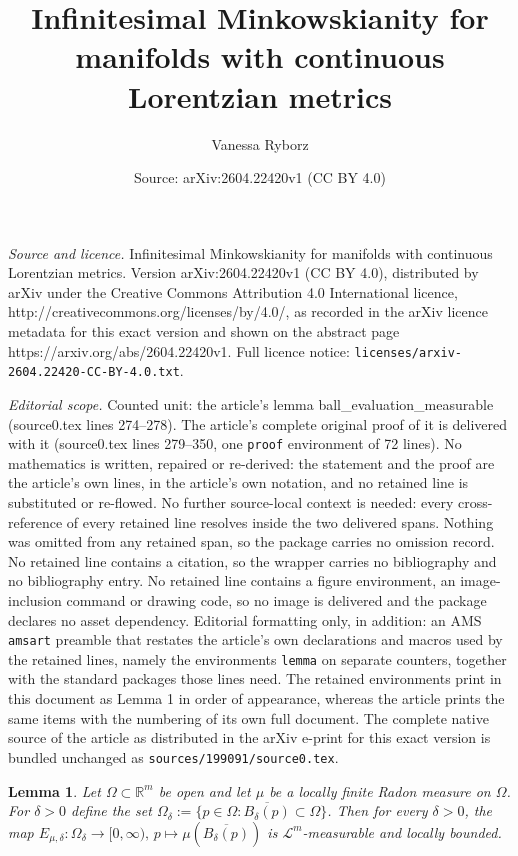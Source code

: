 \documentclass[10pt,a4paper]{amsart}
\title{Infinitesimal Minkowskianity for manifolds with continuous Lorentzian metrics}
\author{Vanessa Ryborz}
\date{Source: arXiv:2604.22420v1 (CC BY 4.0)}
\newtheorem{lemma}{Lemma}
\newcommand{\R}{\mathbb{R}}
\begin{document}
\maketitle

\noindent\emph{Source and licence.} Infinitesimal Minkowskianity for manifolds with continuous Lorentzian metrics. Version arXiv:2604.22420v1 (CC BY 4.0), distributed by arXiv under the Creative Commons Attribution 4.0 International licence, http://creativecommons.org/licenses/by/4.0/, as recorded in the arXiv licence metadata for this exact version and shown on the abstract page https://arxiv.org/abs/2604.22420v1. Full licence notice: \texttt{licenses/arxiv-2604.22420-CC-BY-4.0.txt}.\par\smallskip

\noindent\textit{Editorial scope.} Counted unit: the article's lemma ball\_evaluation\_measurable (source0.tex lines 274--278). The article's complete original proof of it is delivered with it (source0.tex lines 279--350, one \texttt{proof} environment of 72 lines). No mathematics is written, repaired or re-derived: the statement and the proof are the article's own lines, in the article's own notation, and no retained line is substituted or re-flowed.  No further source-local context is needed: every cross-reference of every retained line resolves inside the two delivered spans.  Nothing was omitted from any retained span, so the package carries no omission record.  No retained line contains a citation, so the wrapper carries no bibliography and no bibliography entry.  No retained line contains a figure environment, an image-inclusion command or drawing code, so no image is delivered and the package declares no asset dependency.  Editorial formatting only, in addition: an AMS \texttt{amsart} preamble that restates the article's own declarations and macros used by the retained lines, namely the environments \texttt{lemma} on separate counters, together with the standard packages those lines need.  The retained environments print in this document as Lemma 1 in order of appearance, whereas the article prints the same items with the numbering of its own full document.  The complete native source of the article as distributed in the arXiv e-print for this exact version is bundled unchanged as \texttt{sources/199091/source0.tex}.
\begin{lemma}\label{ball_evaluation_measurable}
    Let $\Omega\subset \R^m$ be open and let $\mu$ be a locally finite Radon measure on $\Omega$. 
    For $\delta>0$ define the set $\Omega_\delta:= \{p \in \Omega: \overline{B_\delta(p)}\subset \Omega\}$. 
    Then for every $\delta>0$, the map $E_{\mu, \delta}\colon \Omega_\delta \to [0, \infty),\,   p\mapsto \mu(\overline{B_\delta(p)})$ is $\mathcal{L}^m$-measurable and locally bounded.
\end{lemma}
\end{document}
